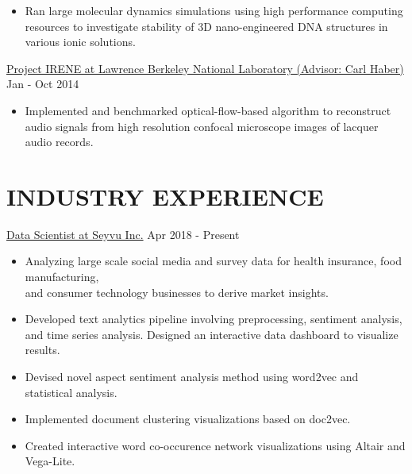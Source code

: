 \documentclass{res}
\begin{document}
\begin{resume}
\begin{itemize}
\item {\normalfont Ran large molecular dynamics simulations using high performance computing resources to investigate stability of 3D nano-engineered DNA structures in various ionic solutions.}
\end{itemize}
\href{https://irene.lbl.gov/}{Project IRENE at Lawrence Berkeley National Laboratory (Advisor: Carl Haber)}  \hfill Jan - Oct 2014\\
\begin{itemize}
\item {\normalfont Implemented and benchmarked optical-flow-based algorithm to reconstruct audio signals from high resolution confocal microscope images of lacquer audio records.}
\end{itemize}
\vspace{-7pt}
\section{INDUSTRY EXPERIENCE}
\href{https://seyvu.ai/}{Data Scientist at Seyvu Inc.}  \hfill Apr 2018 - Present \\
\begin{itemize}
\item Analyzing large scale social media and survey data for  health insurance, food manufacturing, \\and consumer technology businesses to derive market insights.
\item Developed text analytics pipeline involving preprocessing, sentiment analysis, and time series analysis. Designed an interactive data dashboard to visualize results.
\item Devised novel aspect sentiment analysis method using word2vec and statistical analysis.
\item Implemented document clustering visualizations based on doc2vec.
\item Created interactive word co-occurence network visualizations using Altair and Vega-Lite.


\end{itemize}
\end{resume}
\end{document}

